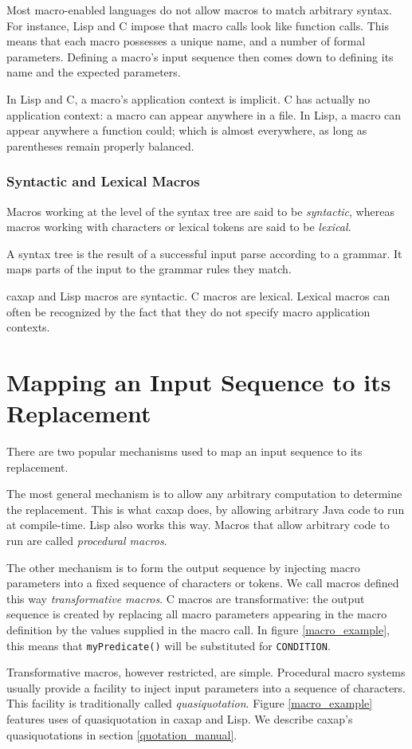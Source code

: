 Most macro-enabled languages do not allow macros to match arbitrary syntax. For
instance, Lisp and C impose that macro calls look like function calls. This
means that each macro possesses a unique name, and a number of formal
parameters. Defining a macro's input sequence then comes down to defining its
name and the expected parameters.

In Lisp and C, a macro's application context is implicit. C has actually no
application context: a macro can appear anywhere in a file. In Lisp, a macro can
appear anywhere a function could; which is almost everywhere, as long as
parentheses remain properly balanced.

\subsubsection{Syntactic and Lexical Macros}

Macros working at the level of the syntax tree are said to be \emph{syntactic},
whereas macros working with characters or lexical tokens are said to be
\emph{lexical}.

A syntax tree is the result of a successful input parse according to a
grammar. It maps parts of the input to the grammar rules they match.

caxap and Lisp macros are syntactic. C macros are lexical. Lexical macros can
often be recognized by the fact that they do not specify macro application
contexts.

\section{Mapping an Input Sequence to its Replacement}

There are two popular mechanisms used to map an input sequence to its
replacement.

The most general mechanism is to allow any arbitrary computation to determine
the replacement. This is what caxap does, by allowing arbitrary Java code to run
at compile-time. Lisp also works this way. Macros that allow arbitrary code to
run are called \emph{procedural macros}.

The other mechanism is to form the output sequence by injecting macro parameters
into a fixed sequence of characters or tokens. We call macros defined this way
\emph{transformative macros}. C macros are transformative: the output sequence
is created by replacing all macro parameters appearing in the macro definition
by the values supplied in the macro call. In figure \ref{macro_example}, this
means that \texttt{myPredicate()} will be substituted for \texttt{CONDITION}.

Transformative macros, however restricted, are simple. Procedural macro systems
usually provide a facility to inject input parameters into a sequence of
characters. This facility is traditionally called \emph{quasiquotation}. Figure
\ref{macro_example} features uses of quasiquotation in caxap and Lisp. We
describe caxap's quasiquotations in section \ref{quotation_manual}.
